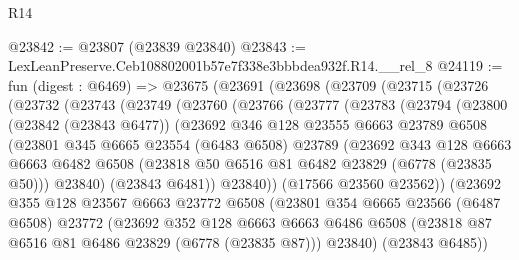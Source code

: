 \begin{lexlean}{R14}
\begin{coremodule}
@23842 := @23807 (@23839 @23840)
@23843 := LexLeanPreserve.Ceb108802001b57e7f338e3bbbdea932f.R14.__rel_8
@24119 := fun (digest : @6469) =>
  @23675
    (@23691
      (@23698
        (@23709
          (@23715
            (@23726
              (@23732
                (@23743
                  (@23749
                    (@23760
                      (@23766
                        (@23777
                          (@23783
                            (@23794
                              (@23800
                                (@23842 (@23843 @6477))
                                (@23692
                                  @346
                                  @128
                                  @23555
                                  @6663
                                  @23789
                                  @6508
                                  (@23801
                                    @345
                                    @6665
                                    @23554
                                    (@6483 @6508)
                                    @23789
                                    (@23692
                                      @343
                                      @128
                                      @6663
                                      @6663
                                      @6482
                                      @6508
                                      (@23818 @50 @6516 @81 @6482 @23829 (@6778 (@23835 @50)))
                                      @23840)
                                    (@23843 @6481))
                                  @23840))
                              (@17566 @23560 @23562))
                            (@23692
                              @355
                              @128
                              @23567
                              @6663
                              @23772
                              @6508
                              (@23801
                                @354
                                @6665
                                @23566
                                (@6487 @6508)
                                @23772
                                (@23692
                                  @352
                                  @128
                                  @6663
                                  @6663
                                  @6486
                                  @6508
                                  (@23818 @87 @6516 @81 @6486 @23829 (@6778 (@23835 @87)))
                                  @23840)
                                (@23843 @6485))

\end{coremodule}
\end{lexlean}
